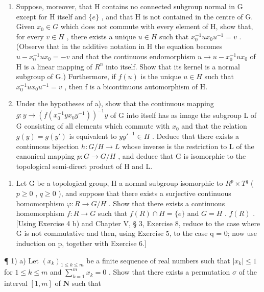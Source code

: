 \begin{enumerate}
\def\labelenumi{\alph{enumi})}
\item
  Suppose, moreover, that H contains no connected subgroup normal in G except for H itself and \(\{e\}\) , and that H is not contained in the centre of G. Given \(x_{0} \in G\) which does not commute with every element of H, show that, for every \(v \in H\) , there exists a unique \(u \in H\) such that \(x_{0}^{-1}ux_{0}u^{-1} = v\) . (Observe that in the additive notation in H the equation becomes \(u - x_{0}^{-1}ux_{0} = -v\) and that the continuous endomorphism \(u \to u - x_{0}^{-1}ux_{0}\) of H is a linear mapping of \(R^{n}\) into itself. Show that its kernel is a normal subgroup of G.) Furthermore, if \(f(u)\) is the unique \(u \in H\) such that \(x_{0}^{-1}ux_{0}u^{-1} = v\) , then f is a bicontinuous automorphism of H.
\item
  Under the hypotheses of a), show that the continuous mapping \(g: y \to (f(x_{0}^{-1}yx_{0}y^{-1}))^{-1}y\) of G into itself has as image the subgroup L of G consisting of all elements which commute with \(x_{0}\) and that the relation \(g(y) = g(y')\) is equivalent to \(yy'^{-1} \in H\) . Deduce that there exists a continuous bijection \(h: G/H \to L\) whose inverse is the restriction to L of the canonical mapping \(p: G \to G/H\) , and deduce that G is isomorphic to the topological semi-direct product of H and L.
\end{enumerate}

\begin{enumerate}
\def\labelenumi{\arabic{enumi})}
\setcounter{enumi}{6}
\tightlist
\item
  Let G be a topological group, H a normal subgroup isomorphic to \(R^{p} \times T^{q}\) ( \(p \geqslant 0\) , \(q \geqslant 0\) ), and suppose that there exists a surjective continuous homomorphism \(\varphi: R \to G/H\) . Show that there exists a continuous homomorphism \(f: R \to G\) such that \(f(R) \cap H = \{e\}\) and \(G = H\) . \(f(R)\) . {[}Using Exercise 4 b) and Chapter V, § 3, Exercise 8, reduce to the case where G is not commutative and then, using Exercise 5, to the case q = 0; now use induction on p, together with Exercise 6.{]}
\end{enumerate}

\ExerciseSection

¶ 1) a) Let \((x_{k})_{1\leqslant k\leqslant m}\) be a finite sequence of real numbers such that \(|x_k|\leqslant 1\) for \(1\leqslant k\leqslant m\) and \(\sum_{k = 1}^{m}x_{k} = 0\) . Show that there exists a permutation \(\sigma\) of the interval \([1,m]\) of \(\mathbf{N}\) such that

